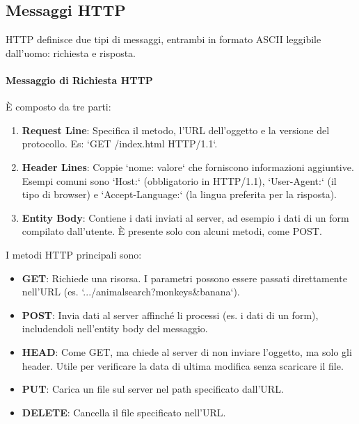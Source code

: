 
\subsection{Messaggi HTTP}
HTTP definisce due tipi di messaggi, entrambi in formato ASCII leggibile dall'uomo: richiesta e risposta.

\paragraph{Messaggio di Richiesta HTTP}
È composto da tre parti:
\begin{enumerate}
    \item \textbf{Request Line}: Specifica il metodo, l'URL dell'oggetto e la versione del protocollo. Es: `GET /index.html HTTP/1.1`.
    \item \textbf{Header Lines}: Coppie `nome: valore` che forniscono informazioni aggiuntive. Esempi comuni sono `Host:` (obbligatorio in HTTP/1.1), `User-Agent:` (il tipo di browser) e `Accept-Language:` (la lingua preferita per la risposta).
    \item \textbf{Entity Body}: Contiene i dati inviati al server, ad esempio i dati di un form compilato dall'utente. È presente solo con alcuni metodi, come POST.
\end{enumerate}

I metodi HTTP principali sono:
\begin{itemize}
    \item \textbf{GET}: Richiede una risorsa. I parametri possono essere passati direttamente nell'URL (es. `.../animalsearch?monkeys\&banana`).
    \item \textbf{POST}: Invia dati al server affinché li processi (es. i dati di un form), includendoli nell'entity body del messaggio.
    \item \textbf{HEAD}: Come GET, ma chiede al server di non inviare l'oggetto, ma solo gli header. Utile per verificare la data di ultima modifica senza scaricare il file.
    \item \textbf{PUT}: Carica un file sul server nel path specificato dall'URL.
    \item \textbf{DELETE}: Cancella il file specificato nell'URL.
\end{itemize}

